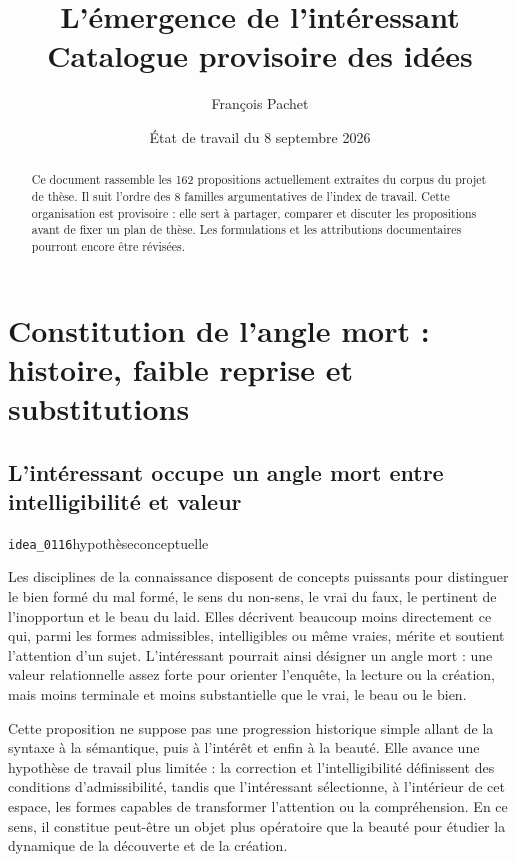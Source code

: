 \documentclass[10pt,a4paper]{article}
\title{L'émergence de l'intéressant\\\large Catalogue provisoire des idées}
\author{François Pachet}
\date{État de travail du 8 septembre 2026}
\begin{document}
\maketitle

\begin{abstract}
Ce document rassemble les 162 propositions actuellement extraites du corpus du projet de thèse. Il suit l'ordre des 8 familles argumentatives de l'index de travail. Cette organisation est provisoire : elle sert à partager, comparer et discuter les propositions avant de fixer un plan de thèse. Les formulations et les attributions documentaires pourront encore être révisées.
\end{abstract}

\tableofcontents
\clearpage
\section{Constitution de l'angle mort : histoire, faible reprise et substitutions}

\subsection{L'intéressant occupe un angle mort entre intelligibilité et valeur}
{\small\color{metadata} \texttt{idea\_0116}\quad\textbullet\quad hypothèse\quad\textbullet\quad conceptuelle\par}

Les disciplines de la connaissance disposent de concepts puissants pour distinguer le bien formé du mal formé, le sens du non-sens, le vrai du faux, le pertinent de l'inopportun et le beau du laid. Elles décrivent beaucoup moins directement ce qui, parmi les formes admissibles, intelligibles ou même vraies, mérite et soutient l'attention d'un sujet. L'intéressant pourrait ainsi désigner un angle mort : une valeur relationnelle assez forte pour orienter l'enquête, la lecture ou la création, mais moins terminale et moins substantielle que le vrai, le beau ou le bien.

Cette proposition ne suppose pas une progression historique simple allant de la syntaxe à la sémantique, puis à l'intérêt et enfin à la beauté. Elle avance une hypothèse de travail plus limitée : la correction et l'intelligibilité définissent des conditions d'admissibilité, tandis que l'intéressant sélectionne, à l'intérieur de cet espace, les formes capables de transformer l'attention ou la compréhension. En ce sens, il constitue peut-être un objet plus opératoire que la beauté pour étudier la dynamique de la découverte et de la création.
\end{document}
